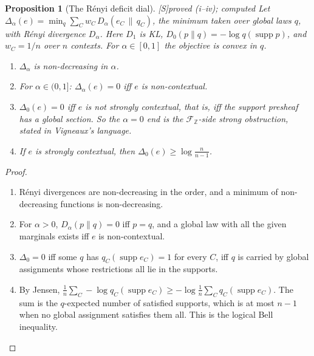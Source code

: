 \documentclass[11pt]{article}
\newtheorem{proposition}[theorem]{Proposition}
\theoremstyle{definition}
\theoremstyle{remark}
\newcommand{\Z}{\mathbb{Z}}
\newcommand{\src}[1]{\textsf{\small[#1]}}
\newcommand{\st}[1]{\textsf{\small\color{gray}#1}}
\begin{document}
\begin{proposition}[The R\'enyi deficit dial]\label{prop:renyi}\src{S}\st{proved (i--iv); computed}
Let $\Delta_\alpha(e)=\min_q\sum_Cw_C\,D_\alpha(e_C\,\|\,q_C)$, the minimum taken over global laws $q$, with R\'enyi divergence $D_\alpha$. Here $D_1$ is KL, $D_0(p\|q)=-\log q(\operatorname{supp}p)$, and $w_C=1/n$ over $n$ contexts. For $\alpha\in[0,1]$ the objective is convex in $q$.
\begin{enumerate}
  \item[(i)] $\Delta_\alpha$ is non-decreasing in $\alpha$.
  \item[(ii)] For $\alpha\in(0,1]$: $\Delta_\alpha(e)=0$ iff $e$ is non-contextual.
  \item[(iii)] $\Delta_0(e)=0$ iff $e$ is \emph{not} strongly contextual, that is, iff the support presheaf has a global section. So the $\alpha=0$ end is the $\mathcal F_{\Z}$-side strong obstruction, stated in Vigneaux's language.
  \item[(iv)] If $e$ is strongly contextual, then $\Delta_0(e)\ge\log\frac{n}{n-1}$.
\end{enumerate}
\end{proposition}
\begin{proof}
\begin{enumerate}
  \item[(i)] R\'enyi divergences are non-decreasing in the order, and a minimum of non-decreasing functions is non-decreasing.
  \item[(ii)] For $\alpha>0$, $D_\alpha(p\|q)=0$ iff $p=q$, and a global law with all the given marginals exists iff $e$ is non-contextual.
  \item[(iii)] $\Delta_0=0$ iff some $q$ has $q_C(\operatorname{supp}e_C)=1$ for every $C$, iff $q$ is carried by global assignments whose restrictions all lie in the supports.
  \item[(iv)] By Jensen, $\frac1n\sum_C-\log q_C(\operatorname{supp}e_C)\ge-\log\frac1n\sum_Cq_C(\operatorname{supp}e_C)$. The sum is the $q$-expected number of satisfied supports, which is at most $n-1$ when no global assignment satisfies them all. This is the logical Bell inequality.
\end{enumerate}
\end{proof}
\end{document}
